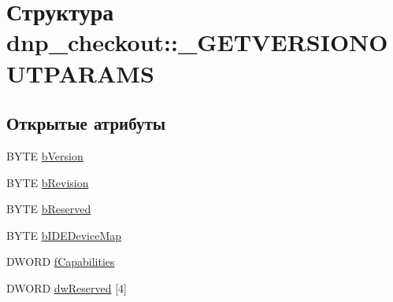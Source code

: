 \hypertarget{structdnp__checkout_1_1___g_e_t_v_e_r_s_i_o_n_o_u_t_p_a_r_a_m_s}{\section{Структура dnp\-\_\-checkout\-:\-:\-\_\-\-G\-E\-T\-V\-E\-R\-S\-I\-O\-N\-O\-U\-T\-P\-A\-R\-A\-M\-S}
\label{structdnp__checkout_1_1___g_e_t_v_e_r_s_i_o_n_o_u_t_p_a_r_a_m_s}
}
\subsection*{Открытые атрибуты}
\begin{DoxyCompactItemize}
\item 
B\-Y\-T\-E \hyperlink{structdnp__checkout_1_1___g_e_t_v_e_r_s_i_o_n_o_u_t_p_a_r_a_m_s_a08efd61f1e9769387398a4327f14b897}{b\-Version}
\item 
B\-Y\-T\-E \hyperlink{structdnp__checkout_1_1___g_e_t_v_e_r_s_i_o_n_o_u_t_p_a_r_a_m_s_a04134c29c1df163eca5d6285ecdab586}{b\-Revision}
\item 
B\-Y\-T\-E \hyperlink{structdnp__checkout_1_1___g_e_t_v_e_r_s_i_o_n_o_u_t_p_a_r_a_m_s_a980c3a478d62053e6dd6981e27437310}{b\-Reserved}
\item 
B\-Y\-T\-E \hyperlink{structdnp__checkout_1_1___g_e_t_v_e_r_s_i_o_n_o_u_t_p_a_r_a_m_s_ada21efcf57e0ee3de55e1d60212040ee}{b\-I\-D\-E\-Device\-Map}
\item 
D\-W\-O\-R\-D \hyperlink{structdnp__checkout_1_1___g_e_t_v_e_r_s_i_o_n_o_u_t_p_a_r_a_m_s_af1fed3b32f46f4c49a4ac973eca7bbd1}{f\-Capabilities}
\item 
D\-W\-O\-R\-D \hyperlink{structdnp__checkout_1_1___g_e_t_v_e_r_s_i_o_n_o_u_t_p_a_r_a_m_s_a7d84519340617de4ee7e956d7721dccf}{dw\-Reserved} \mbox{[}4\mbox{]}
\end{DoxyCompactItemize}


